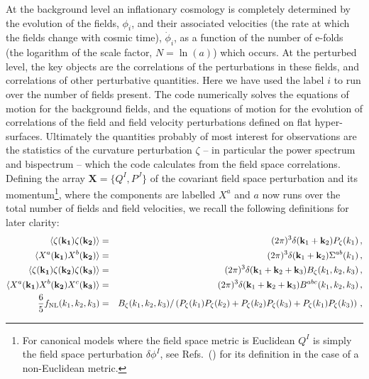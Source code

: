 \documentclass[10pt,
amsmath,amssymb,
aps,prd,nofootinbib,eqsecnum,a4paper]{revtex4}
\begin{document}
At the background level an inflationary cosmology is completely determined by the evolution of the 
fields, $\phi_i$, and their associated velocities (the rate at which the fields change with cosmic time), $\dot \phi_i$,
as a function of the number of e-folds (the logarithm of the scale factor, $N=\ln(a)$) which occurs.
At the perturbed level, the key objects are the 
correlations of the perturbations in these fields, 
and correlations of other perturbative quantities.  Here we have used the label $i$ 
to run over the number of fields present. 
The code numerically solves the equations of motion for the background fields, and 
the equations of motion for the evolution of correlations of the field and field velocity perturbations 
defined on flat hyper-surfaces. Ultimately the quantities 
probably of most interest for observations are the statistics of the curvature perturbation 
$\zeta$ -- in particular the power spectrum and bispectrum -- which the code calculates from the 
field space correlations. 
Defining the array ${\mathbf X} = \{{ Q^I}, { P^J} \}$ of the covariant field space perturbation and its momentum\footnote{For canonical models where the field space metric is Euclidean $Q^I$ is simply the field space perturbation $\delta \phi^I$, see Refs.~(\cite{Gong:2011uw,Elliston:2012ab}) for its definition in the case of a non-Euclidean metric.}, where 
the components are labelled $X^a$ and $a$ now runs over the total number of fields and field velocities, 
we recall the following definitions for later clarity:
\begin{eqnarray}
\langle \zeta(\mathbf{k_1}) \zeta(\mathbf{k_2})  \rangle &=& (2\pi)^3 \delta(\mathbf{k}_1 + \mathbf{k}_2 )
        P_\zeta(k_1) \,, \\
\langle X^a(\mathbf{k_1}) X^b(\mathbf{k_2})  \rangle &=& (2\pi)^3 \delta(\mathbf{k}_1 + \mathbf{k}_2 )
        \Sigma^{ab}(k_1) \,, \\
\langle \zeta(\mathbf{k_1}) \zeta(\mathbf{k_2}) \zeta(\mathbf{k_3}) \rangle &=& (2\pi)^3 \delta(\mathbf{k}_1 + \mathbf{k}_2 + \mathbf{k}_3)
        B_\zeta(k_1, k_2, k_3) \,, \\
\langle X^a(\mathbf{k_1}) X^b(\mathbf{k_2}) X^c(\mathbf{k_3}) \rangle &=& (2\pi)^3 \delta(\mathbf{k}_1 + \mathbf{k}_2 + \mathbf{k}_3)
        B^{abc}(k_1, k_2, k_3)\,, \\
        \frac{6}{5}f_{\rm NL}(k_1,k_2,k_3) &=& B_\zeta(k_1,k_2,k_3)/ \left( P_\zeta(k_1)P_\zeta(k_2) + P_\zeta(k_2)P_\zeta(k_3) + P_\zeta(k_1)P_\zeta(k_3) \right ) \, , 
\end{eqnarray}
\end{document}
